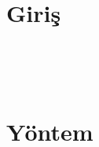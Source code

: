 \documentclass[12pt,a4paper]{article}
\begin{document}
\onehalfspacing
\section{Giriş}
\paragrafA\ \paragrafB

\paragrafC\ \paragrafA

\section{Yöntem}
\begin{doublespace}
\paragrafB\ \paragrafC

\paragrafA
\end{doublespace}
\end{document}
